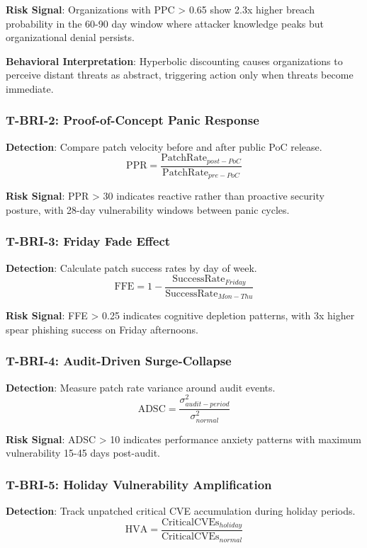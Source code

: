 \documentclass[11pt,a4paper]{article}
\begin{document}
\textbf{Risk Signal}: Organizations with PPC > 0.65 show 2.3x higher breach probability in the 60-90 day window where attacker knowledge peaks but organizational denial persists.

\textbf{Behavioral Interpretation}: Hyperbolic discounting causes organizations to perceive distant threats as abstract, triggering action only when threats become immediate.

\subsubsection{T-BRI-2: Proof-of-Concept Panic Response}
\textbf{Detection}: Compare patch velocity before and after public PoC release.
\begin{equation}
\text{PPR} = \frac{\text{PatchRate}_{post-PoC}}{\text{PatchRate}_{pre-PoC}}
\end{equation}

\textbf{Risk Signal}: PPR > 30 indicates reactive rather than proactive security posture, with 28-day vulnerability windows between panic cycles.

\subsubsection{T-BRI-3: Friday Fade Effect}
\textbf{Detection}: Calculate patch success rates by day of week.
\begin{equation}
\text{FFE} = 1 - \frac{\text{SuccessRate}_{Friday}}{\text{SuccessRate}_{Mon-Thu}}
\end{equation}

\textbf{Risk Signal}: FFE > 0.25 indicates cognitive depletion patterns, with 3x higher spear phishing success on Friday afternoons.

\subsubsection{T-BRI-4: Audit-Driven Surge-Collapse}
\textbf{Detection}: Measure patch rate variance around audit events.
\begin{equation}
\text{ADSC} = \frac{\sigma^2_{audit-period}}{\sigma^2_{normal}}
\end{equation}

\textbf{Risk Signal}: ADSC > 10 indicates performance anxiety patterns with maximum vulnerability 15-45 days post-audit.

\subsubsection{T-BRI-5: Holiday Vulnerability Amplification}
\textbf{Detection}: Track unpatched critical CVE accumulation during holiday periods.
\begin{equation}
\text{HVA} = \frac{\text{CriticalCVEs}_{holiday}}{\text{CriticalCVEs}_{normal}}
\end{equation}
\end{document}
